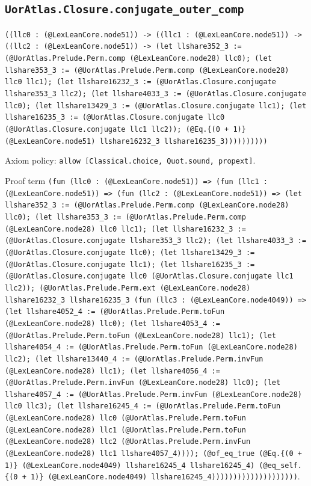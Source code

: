 \documentclass[11pt]{article}
\begin{document}
\subsection*{\texttt{UorAtlas.Closure.conjugate\_outer\_comp}}
\noindent\texttt{((llc0 : (@LexLeanCore.node51)) -> ((llc1 : (@LexLeanCore.node51)) -> ((llc2 : (@LexLeanCore.node51)) -> (let llshare352\_3 := (@UorAtlas.Prelude.Perm.comp (@LexLeanCore.node28) llc0); (let llshare353\_3 := (@UorAtlas.Prelude.Perm.comp (@LexLeanCore.node28) llc0 llc1); (let llshare16232\_3 := (@UorAtlas.Closure.conjugate llshare353\_3 llc2); (let llshare4033\_3 := (@UorAtlas.Closure.conjugate llc0); (let llshare13429\_3 := (@UorAtlas.Closure.conjugate llc1); (let llshare16235\_3 := (@UorAtlas.Closure.conjugate llc0 (@UorAtlas.Closure.conjugate llc1 llc2)); (@Eq.\{(0 + 1)\} (@LexLeanCore.node51) llshare16232\_3 llshare16235\_3))))))))))}\par
\noindent Axiom policy: \texttt{allow [Classical.choice, Quot.sound, propext]}.\par
\noindent Proof term \texttt{(fun (llc0 : (@LexLeanCore.node51)) => (fun (llc1 : (@LexLeanCore.node51)) => (fun (llc2 : (@LexLeanCore.node51)) => (let llshare352\_3 := (@UorAtlas.Prelude.Perm.comp (@LexLeanCore.node28) llc0); (let llshare353\_3 := (@UorAtlas.Prelude.Perm.comp (@LexLeanCore.node28) llc0 llc1); (let llshare16232\_3 := (@UorAtlas.Closure.conjugate llshare353\_3 llc2); (let llshare4033\_3 := (@UorAtlas.Closure.conjugate llc0); (let llshare13429\_3 := (@UorAtlas.Closure.conjugate llc1); (let llshare16235\_3 := (@UorAtlas.Closure.conjugate llc0 (@UorAtlas.Closure.conjugate llc1 llc2)); (@UorAtlas.Prelude.Perm.ext (@LexLeanCore.node28) llshare16232\_3 llshare16235\_3 (fun (llc3 : (@LexLeanCore.node4049)) => (let llshare4052\_4 := (@UorAtlas.Prelude.Perm.toFun (@LexLeanCore.node28) llc0); (let llshare4053\_4 := (@UorAtlas.Prelude.Perm.toFun (@LexLeanCore.node28) llc1); (let llshare4054\_4 := (@UorAtlas.Prelude.Perm.toFun (@LexLeanCore.node28) llc2); (let llshare13440\_4 := (@UorAtlas.Prelude.Perm.invFun (@LexLeanCore.node28) llc1); (let llshare4056\_4 := (@UorAtlas.Prelude.Perm.invFun (@LexLeanCore.node28) llc0); (let llshare4057\_4 := (@UorAtlas.Prelude.Perm.invFun (@LexLeanCore.node28) llc0 llc3); (let llshare16245\_4 := (@UorAtlas.Prelude.Perm.toFun (@LexLeanCore.node28) llc0 (@UorAtlas.Prelude.Perm.toFun (@LexLeanCore.node28) llc1 (@UorAtlas.Prelude.Perm.toFun (@LexLeanCore.node28) llc2 (@UorAtlas.Prelude.Perm.invFun (@LexLeanCore.node28) llc1 llshare4057\_4)))); (@of\_eq\_true (@Eq.\{(0 + 1)\} (@LexLeanCore.node4049) llshare16245\_4 llshare16245\_4) (@eq\_self.\{(0 + 1)\} (@LexLeanCore.node4049) llshare16245\_4))))))))))))))))))))}.\par
\end{document}
